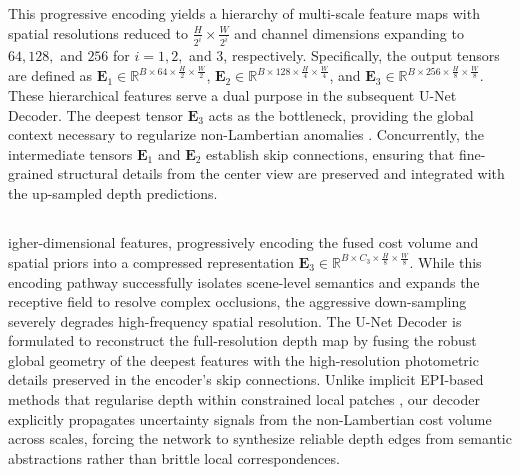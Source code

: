 \documentclass[lettersize,journal]{IEEEtran}
\begin{document}
This progressive encoding yields a hierarchy of multi-scale feature maps with spatial resolutions reduced to $\frac{H}{2^i} \times \frac{W}{2^i}$ and channel dimensions expanding to $64, 128,$ and $256$ for $i=1, 2,$ and $3$, respectively. Specifically, the output tensors are defined as $\mathbf{E}_1 \in \mathbb{R}^{B \times 64 \times \frac{H}{2} \times \frac{W}{2}}$, $\mathbf{E}_2 \in \mathbb{R}^{B \times 128 \times \frac{H}{4} \times \frac{W}{4}}$, and $\mathbf{E}_3 \in \mathbb{R}^{B \times 256 \times \frac{H}{8} \times \frac{W}{8}}$. These hierarchical features serve a dual purpose in the subsequent U-Net Decoder. The deepest tensor $\mathbf{E}_3$ acts as the bottleneck, providing the global context necessary to regularize non-Lambertian anomalies \cite{lin2017}. Concurrently, the intermediate tensors $\mathbf{E}_1$ and $\mathbf{E}_2$ establish skip connections, ensuring that fine-grained structural details from the center view are preserved and integrated with the up-sampled depth predictions.

\subsection{}

igher-dimensional features, progressively encoding the fused cost volume and spatial priors into a compressed representation $\mathbf{E}_3 \in \mathbb{R}^{B \times C_3 \times \frac{H}{8} \times \frac{W}{8}}$. While this encoding pathway successfully isolates scene-level semantics and expands the receptive field to resolve complex occlusions, the aggressive down-sampling severely degrades high-frequency spatial resolution. The U-Net Decoder is formulated to reconstruct the full-resolution depth map by fusing the robust global geometry of the deepest features with the high-resolution photometric details preserved in the encoder's skip connections. Unlike implicit EPI-based methods that regularise depth within constrained local patches \cite{heber2018}, our decoder explicitly propagates uncertainty signals from the non-Lambertian cost volume across scales, forcing the network to synthesize reliable depth edges from semantic abstractions rather than brittle local correspondences.
\end{document}
